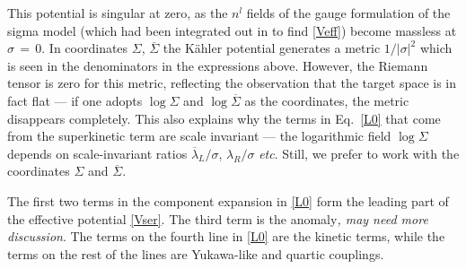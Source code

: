 \documentclass[epsfig,12pt]{article}
\newcommand{\ov}{\overline}
\begin{document}
	This potential is singular at zero, as the $ n^l $ fields of the 
	gauge formulation of the sigma model 
	(which had been integrated out in \cite{SYhet} to find \eqref{Veff}) 
	become massless at $ \sigma \,=\, 0 $.
	In coordinates $ \Sigma $, $ \ov\Sigma $ the K\"ahler potential generates a metric $ 1 / |\sigma|^2 $
	which is seen in the denominators in the expressions above.
	However, the Riemann tensor is zero for this metric, reflecting the
	observation that the target space is in fact flat ---
	if one adopts $ \log \Sigma $ and $ \log \ov\Sigma $ as the coordinates, the metric
	disappears completely.
	This also explains why the terms in Eq.~\eqref{L0} that come from the
	superkinetic term are scale invariant ---
	the logarithmic field $ \log \Sigma $ depends on scale-invariant ratios
	$ \ov\lambda{}_L/\sigma $, $ \lambda_R/\sigma $ {\it etc}.
	Still, we prefer to work with the coordinates $ \Sigma $ and $ \ov\Sigma $.

	The first two terms in the component expansion in \eqref{L0} form the 
	leading part of the effective potential \eqref{Vser}.
	The third term is the anomaly{\it, may need more discussion}.
	The terms on the fourth line in \eqref{L0} are the kinetic terms, 
	while the terms on the rest of the lines are Yukawa-like and quartic couplings.
\end{document}
